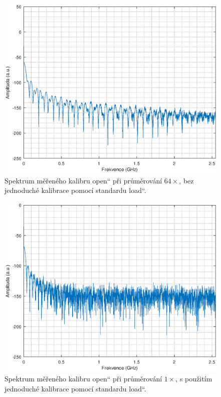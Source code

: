 \begin{figure}[htbp]
\includegraphics[width=\textwidth,keepaspectratio]{images/noise_raw_avg64.eps}\caption{Spektrum měřeného kalibru \quotedblbase open\textquotedblleft{} při průměrování $64\times$, bez jednoduché kalibrace pomocí standardu \quotedblbase load\textquotedblleft .}\label{noise_raw_avg64}
\end{figure}

\begin{figure}[htbp]
\includegraphics[width=\textwidth,keepaspectratio]{images/noise_cal_avg1.eps}\caption{Spektrum měřeného kalibru \quotedblbase open\textquotedblleft{} při průměrování $1\times$, s použitím jednoduché kalibrace pomocí standardu \quotedblbase load\textquotedblleft .}\label{noise_cal_avg1}
\end{figure}

